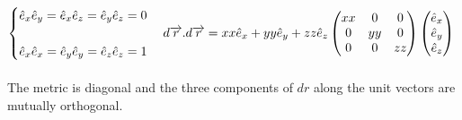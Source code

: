 \documentclass[fleqn]{article}
\begin{document}
\begin{enumerate}
{      $
        \begin{cases}
          \hat{e}_x\hat{e}_y=\hat{e}_x\hat{e}_z=\hat{e}_y\hat{e}_z=0 \\
          \\
          \hat{e}_x\hat{e}_x=\hat{e}_y\hat{e}_y=\hat{e}_z\hat{e}_z=1
        \end{cases} \\
        \\
        \\
        d\overrightarrow{r}.d\overrightarrow{r}=xx\hat{e}_x+yy\hat{e}_y+zz\hat{e}_z \\
        \\
        \\
        \begin{pmatrix}
          xx & 0 & 0 \\
          0 & yy & 0 \\
          0 & 0 & zz
        \end{pmatrix} \begin{pmatrix}
          \hat{e}_x \\
          \hat{e}_y \\
          \hat{e}_z
        \end{pmatrix}
      $ \\
      \\
      The metric is diagonal and the three components of $dr$ along the unit vectors are mutually orthogonal.
    }

    
  \end{enumerate}
\end{document}
